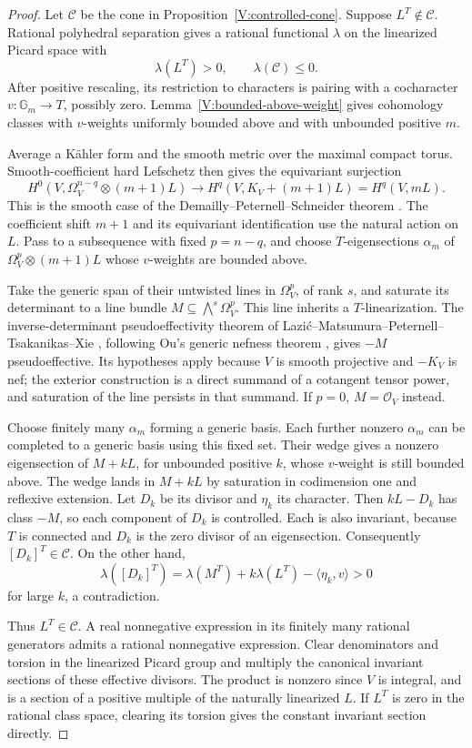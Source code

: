 \begin{proof}
Let $\mathcal C$ be the cone in Proposition~\ref{V:controlled-cone}.
Suppose $L^T\notin\mathcal C$.  Rational polyhedral separation gives
a rational functional $\lambda$ on the linearized Picard space with
\[
 \lambda(L^T)>0,\qquad \lambda(\mathcal C)\le0.
\]
After positive rescaling, its restriction to characters is pairing with
a cocharacter $v:\mathbb G_m\to T$, possibly zero.
Lemma~\ref{V:bounded-above-weight} gives cohomology classes with
$v$-weights uniformly bounded above and with unbounded positive $m$.

Average a K\"ahler form and the smooth metric over the maximal compact
torus.  Smooth-coefficient hard Lefschetz then gives the equivariant
surjection
\[
 H^0(V,\Omega_V^{n-q}\otimes(m+1)L)
       \longrightarrow H^q(V,K_V+(m+1)L)=H^q(V,mL).
\]
This is the smooth case of the Demailly--Peternell--Schneider theorem
\cite[Theorem~0.1]{DPS2001}.
The coefficient shift $m+1$ and its equivariant identification use the
natural action on $L$.  Pass to a subsequence with fixed
$p=n-q$, and choose $T$-eigensections $\alpha_m$ of
$\Omega_V^p\otimes(m+1)L$ whose $v$-weights are bounded above.

Take the generic span of their untwisted lines in $\Omega_V^p$,
of rank $s$, and saturate its determinant to a line bundle
$M\subseteq\bigwedge^s\Omega_V^p$.  This line inherits a
$T$-linearization.  The inverse-determinant pseudoeffectivity theorem
of Lazi\'c--Matsumura--Peternell--Tsakanikas--Xie
\cite[Theorem~4.1]{LMPTX2023}, following Ou's generic nefness theorem
\cite[Theorem~1.4]{Ou2023}, gives $-M$ pseudoeffective.  Its hypotheses apply because $V$ is
smooth projective and $-K_V$ is nef; the exterior construction is a
direct summand of a cotangent tensor power, and saturation of the line
persists in that summand.  If $p=0$, $M=\mathcal O_V$ instead.

Choose finitely many $\alpha_m$ forming a generic basis.  Each further
nonzero $\alpha_m$ can be completed to a generic basis using this
fixed set.  Their wedge gives a nonzero eigensection of $M+kL$, for
unbounded positive $k$, whose $v$-weight is still bounded above.  The
wedge lands in $M+kL$ by saturation in codimension one and reflexive
extension.  Let $D_k$ be its divisor and $\eta_k$ its character.
Then $kL-D_k$ has class $-M$, so each component of $D_k$ is controlled.
Each is also invariant, because $T$ is connected and $D_k$ is the
zero divisor of an eigensection.  Consequently $[D_k]^T\in\mathcal C$.
On the other hand,
\[
 \lambda([D_k]^T)=\lambda(M^T)+k\lambda(L^T)
                              -\langle\eta_k,v\rangle>0
\]
for large $k$, a contradiction.

Thus $L^T\in\mathcal C$.  A real nonnegative expression in its
finitely many rational generators admits a rational nonnegative
expression.  Clear denominators and torsion in the linearized Picard
group and multiply the canonical invariant sections of these effective
divisors.  The product is nonzero since $V$ is integral, and is a
section of a positive multiple of the naturally linearized $L$.
If $L^T$ is zero in the rational class space, clearing its torsion gives
the constant invariant section directly.
\end{proof}
